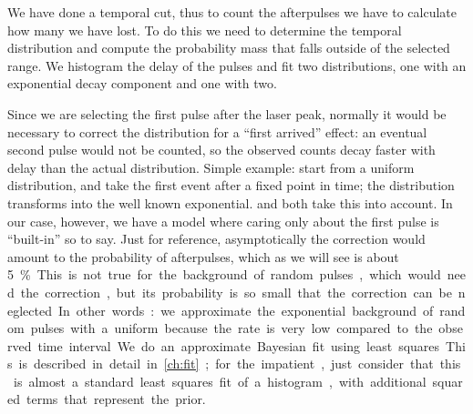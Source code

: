 \begin{figure}
    

    
\end{figure}

We have done a temporal cut, thus to count the afterpulses we have to calculate
how many we have lost. To do this we need to determine the temporal
distribution and compute the probability mass that falls outside of the
selected range. We histogram the delay of the pulses and fit two distributions,
one with an exponential decay component and one with two.

Since we are selecting the first pulse after the laser peak, normally it would
be necessary to correct the distribution for a ``first arrived'' effect: an
eventual second pulse would not be counted, so the observed counts decay faster
with delay than the actual distribution. Simple example: start from a uniform
distribution, and take the first event after a fixed point in time; the
distribution transforms into the well known exponential. \cite[2]{cova1991} and
\cite[4]{garutti2014} both take this into account. In our case, however, we
have a model where caring only about the first pulse is ``built-in'' so to say.
Just for reference, asymptotically the correction would amount to the
probability of afterpulses, which as we will see is about \SI{5}\%.

This is not true for the background of random pulses, which would need the
correction, but its probability is so small that the correction can be
neglected. In other words: we approximate the exponential background of random
pulses with a uniform because the rate is very low compared to the observed
time interval.

We do an approximate Bayesian fit using least squares. This is described in
detail in \autoref{ch:fit}; for the impatient, just consider that this is
almost a standard least squares fit of a histogram, with additional squared
terms that represent the prior.

